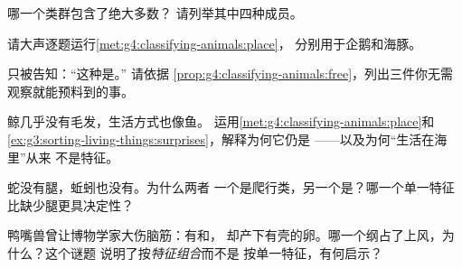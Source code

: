 \begin{exercise}[$\star$]\label{exo:g4:classifying-animals:6}
哪一个类群包含了绝大多数？
请列举其中四种成员。
\end{exercise}

\begin{exercise}[$\star$]\label{exo:g4:classifying-animals:7}
请大声逐题运行\cref{met:g4:classifying-animals:place}，
分别用于企鹅和海豚。
\end{exercise}

\begin{exercise}[$\star$]\label{exo:g4:classifying-animals:8}
只被告知：“这种是。”
请依据
\cref{prop:g4:classifying-animals:free}，列出三件你无需观察就能预料到的事。
\end{exercise}

\begin{exercise}[$\star\star$]\label{exo:g4:classifying-animals:9}
鲸几乎没有毛发，生活方式也像鱼。
运用\cref{met:g4:classifying-animals:place}和
\cref{ex:g3:sorting-living-things:surprises}，解释为何它仍是
——以及为何“生活在海里”从来
不是特征。
\end{exercise}

\begin{exercise}[$\star\star$]\label{exo:g4:classifying-animals:10}
蛇没有腿，蚯蚓也没有。为什么两者
一个是爬行类，另一个是？哪一个单一特征
比缺少腿更具决定性？
\end{exercise}

\begin{exercise}[$\star\star\star$]\label{exo:g4:classifying-animals:11}
鸭嘴兽曾让博物学家大伤脑筋：有和，
却产下有壳的卵。哪一个纲占了上风，为什么？这个谜题
说明了按\emph{特征组合}而不是
按单一特征，有何启示？
\end{exercise}

